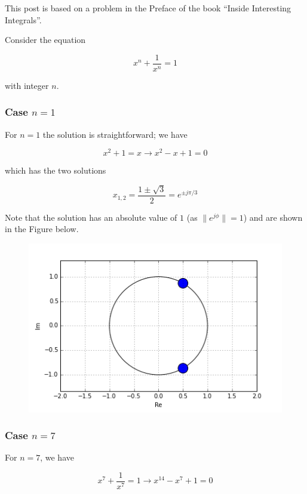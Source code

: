 
This post is based on a problem in the Preface of the book ``Inside
Interesting Integrals''.

Consider the equation

\begin{equation}
\label{eq:n2}
x^n + \frac{1}{x^n} = 1
\end{equation}

with integer \(n\).

\subsubsection{Case \(n=1\)}

For \(n=1\) the solution is straightforward; we have

\[
x^2 + 1 = x \rightarrow x^2 - x + 1 = 0
\]

which has the two solutions

\[
x_{1,2} = \frac{1 \pm \sqrt{3}}{2} = e^{\pm j\pi/3}
\]

Note that the solution has an absolute value of \(1\) (as
\(\|e^{j \phi}\| = 1\)) and are shown in the Figure below.

\begin{figure}
\includegraphics[scale=0.7]{images/complex_solutions.png}
\end{figure}

\subsubsection{Case \(n = 7\)}

For \(n = 7\), we have

\begin{equation}
\label{eq:n7}
x^7 + \frac{1}{x^7} = 1 \rightarrow x^{14} - x^7 + 1 = 0
\end{equation}

